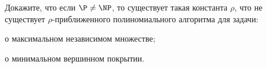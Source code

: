 Докажите, что если $\P \neq \NP$, то существует такая константа $\rho$, что не существует $\rho$-приближенного
полиномиального алгоритма для задачи:
\begin{enumcyr}
    \item о максимальном независимом множестве;
    \item о минимальном вершинном покрытии.
\end{enumcyr}
